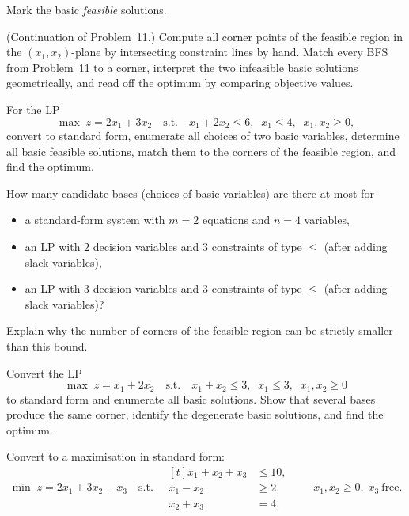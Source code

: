 \begin{problems}
        Mark the basic \emph{feasible} solutions.
  \item (Continuation of Problem~11.) Compute all corner points of the
        feasible region in the $(x_{1},x_{2})$-plane by intersecting
        constraint lines by hand. Match every BFS from Problem~11 to a
        corner, interpret the two infeasible basic solutions geometrically,
        and read off the optimum by comparing objective values.
  \item For the LP
        \[
          \max\; z=2x_{1}+3x_{2}
          \quad\text{s.t.}\quad
          x_{1}+2x_{2}\le 6,\;\;
          x_{1}\le 4,\;\;
          x_{1},x_{2}\ge 0 ,
        \]
        convert to standard form, enumerate all choices of two basic
        variables, determine all basic feasible solutions, match them to
        the corners of the feasible region, and find the optimum.
  \item How many candidate bases (choices of basic variables) are there at
        most for
        \begin{itemize}[leftmargin=1.8em,itemsep=0.2ex]
          \item[(a)] a standard-form system with $m=2$ equations and $n=4$
                variables,
          \item[(b)] an LP with $2$ decision variables and $3$ constraints
                of type $\le$ (after adding slack variables),
          \item[(c)] an LP with $3$ decision variables and $3$ constraints
                of type $\le$ (after adding slack variables)?
        \end{itemize}
        Explain why the number of corners of the feasible region can be
        strictly smaller than this bound.
  \item Convert the LP
        \[
          \max\; z=x_{1}+2x_{2}
          \quad\text{s.t.}\quad
          x_{1}+x_{2}\le 3,\;\;
          x_{1}\le 3,\;\;
          x_{1},x_{2}\ge 0
        \]
        to standard form and enumerate all basic solutions. Show that
        several bases produce the same corner, identify the degenerate
        basic solutions, and find the optimum.
  \item Convert to a maximisation in standard form:
        \[
          \min\; z=2x_{1}+3x_{2}-x_{3}
          \quad\text{s.t.}\quad
          \begin{aligned}[t]
            x_{1}+x_{2}+x_{3}&\le 10,\\
            x_{1}-x_{2}&\ge 2,\\
            x_{2}+x_{3}&=4,
          \end{aligned}
          \qquad x_{1},x_{2}\ge 0,\; x_{3}\ \text{free}.
        \]
\end{problems}

